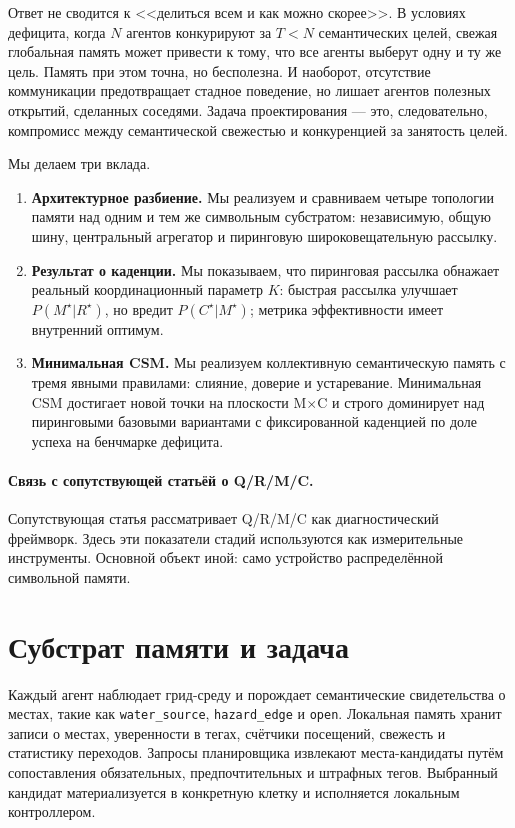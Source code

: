 \documentclass{article}
\begin{document}
Ответ не сводится к <<делиться всем и как можно скорее>>. В условиях
дефицита, когда $N$ агентов конкурируют за $T<N$ семантических целей,
свежая глобальная память может привести к тому, что все агенты выберут
одну и ту же цель. Память при этом точна, но бесполезна. И наоборот,
отсутствие коммуникации предотвращает стадное поведение, но лишает
агентов полезных открытий, сделанных соседями. Задача проектирования
--- это, следовательно, компромисс между семантической свежестью и
конкуренцией за занятость целей.

Мы делаем три вклада.
\begin{enumerate}[leftmargin=20pt,itemsep=2pt,topsep=2pt]
\item \textbf{Архитектурное разбиение.} Мы реализуем и сравниваем четыре топологии памяти над одним и тем же символьным субстратом: независимую, общую шину, центральный агрегатор и пиринговую широковещательную рассылку.
\item \textbf{Результат о каденции.} Мы показываем, что пиринговая рассылка обнажает реальный координационный параметр $K$: быстрая рассылка улучшает $P(M^\star|R^\star)$, но вредит $P(C^\star|M^\star)$; метрика эффективности имеет внутренний оптимум.
\item \textbf{Минимальная CSM.} Мы реализуем коллективную семантическую память с тремя явными правилами: слияние, доверие и устаревание. Минимальная CSM достигает новой точки на плоскости M$\times$C и строго доминирует над пиринговыми базовыми вариантами с фиксированной каденцией по доле успеха на бенчмарке дефицита.
\end{enumerate}

\paragraph{Связь с сопутствующей статьёй о Q/R/M/C.}
Сопутствующая статья рассматривает Q/R/M/C как диагностический
фреймворк. Здесь эти показатели стадий используются как измерительные
инструменты. Основной объект иной: само устройство распределённой
символьной памяти.

\section{Субстрат памяти и задача}
\label{p4:sec:substrate}

Каждый агент наблюдает грид-среду и порождает семантические
свидетельства о местах, такие как \texttt{water\_source},
\texttt{hazard\_edge} и \texttt{open}. Локальная память хранит записи
о местах, уверенности в тегах, счётчики посещений, свежесть и
статистику переходов. Запросы планировщика извлекают
места-кандидаты путём сопоставления обязательных, предпочтительных и
штрафных тегов. Выбранный кандидат материализуется в конкретную клетку
и исполняется локальным контроллером.
\end{document}

